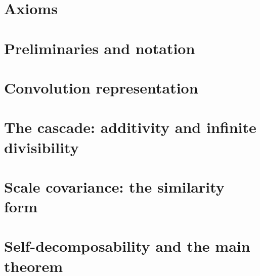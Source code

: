 %


\setcounter{chapter}{1}

\chapter{Axioms}


\chapter{Preliminaries and notation}


\chapter{Convolution representation}


\chapter{The cascade: additivity and infinite divisibility}


\chapter{Scale covariance: the similarity form}


\chapter{Self-decomposability and the main theorem}


